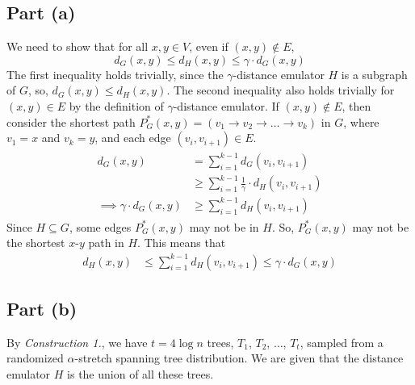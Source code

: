 \documentclass[9pt]{article}
\begin{document}
\subsection*{Part (a)}
We need to show that for all $x, y \in V$, even if $(x, y) \notin E$,
\begin{equation}
    d_{G}(x, y) \leq d_{H}(x, y) \leq \gamma \cdot d_{G}(x, y)
\end{equation}
The first inequality holds trivially, since the $\gamma$-distance emulator $H$ is a subgraph of
$G$, so, $d_{G}(x, y) \leq d_{H}(x, y)$. The second inequality also holds trivially for
$(x, y) \in E$ by the definition of $\gamma$-distance emulator. If $(x, y) \notin E$, then
consider the shortest path $P^{*}_{G}(x, y) = (v_{1} \to v_{2} \to \ldots \to v_{k})$ in $G$,
where $v_{1} = x$ and $v_{k} = y$, and each edge $(v_{i}, v_{i+1}) \in E$.
\begin{align}
    \begin{split}
        d_{G}(x, y) &= \sum_{i=1}^{k-1} d_{G}(v_{i}, v_{i+1}) \\
        &\geq \sum_{i=1}^{k-1} \frac{1}{\gamma} \cdot d_{H}(v_{i}, v_{i+1}) \\
        \implies \gamma \cdot d_{G}(x, y) &\geq \sum_{i=1}^{k-1} d_{H}(v_{i}, v_{i+1})
    \end{split}
\end{align}
Since $H \subseteq G$, some edges $P^{*}_{G}(x, y)$ may not be in $H$. So, $P^{*}_{G}(x, y)$
may not be the shortest $x$-$y$ path in $H$. This means that
\begin{align}
    d_{H}(x, y) &\leq \sum_{i=1}^{k-1} d_{H}(v_{i}, v_{i+1}) \leq \gamma \cdot d_{G}(x, y)
\end{align}

\subsection*{Part (b)}
By \textit{Construction 1.}, we have $t = 4 \log{n}$ trees, $T_{1}$, $T_{2}$, $\ldots$,
$T_{t}$, sampled from a randomized $\alpha$-stretch spanning tree distribution. We are given
that the distance emulator $H$ is the union of all these trees.
\end{document}
